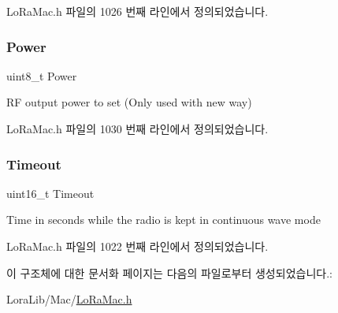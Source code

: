 Lo\+Ra\+Mac.\+h 파일의 1026 번째 라인에서 정의되었습니다.

\mbox{\label{structs_mlme_req_tx_cw_ab44615b5dd16068c5a1bfb228b72c081}} 
\subsubsection{\texorpdfstring{Power}{Power}}
{\footnotesize\ttfamily uint8\+\_\+t Power}

RF output power to set (Only used with new way) 

Lo\+Ra\+Mac.\+h 파일의 1030 번째 라인에서 정의되었습니다.

\mbox{\label{structs_mlme_req_tx_cw_ae1c58f120c7eef7bb71a5e3bfeaeb795}} 
\subsubsection{\texorpdfstring{Timeout}{Timeout}}
{\footnotesize\ttfamily uint16\+\_\+t Timeout}

Time in seconds while the radio is kept in continuous wave mode 

Lo\+Ra\+Mac.\+h 파일의 1022 번째 라인에서 정의되었습니다.



이 구조체에 대한 문서화 페이지는 다음의 파일로부터 생성되었습니다.\+:\begin{DoxyCompactItemize}
\item 
Lora\+Lib/\+Mac/\mbox{\hyperlink{_lo_ra_mac_8h}{Lo\+Ra\+Mac.\+h}}\end{DoxyCompactItemize}

